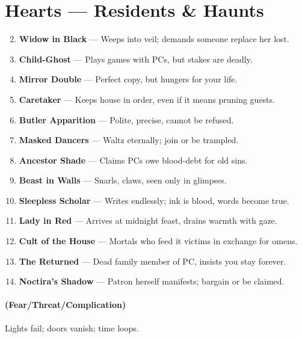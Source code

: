 \documentclass[11pt]{article}
\begin{document}
\section*{Hearts --- Residents \& Haunts}
\label{sec:haunted-house-residents}
\begin{enumerate}
\setcounter{enumi}{1}
\item \textbf{Widow in Black} --- Weeps into veil; demands someone replace her lost.
\item \textbf{Child-Ghost} --- Plays games with PCs, but stakes are deadly.
\item \textbf{Mirror Double} --- Perfect copy, but hungers for your life.
\item \textbf{Caretaker} --- Keeps house in order, even if it means pruning guests.
\item \textbf{Butler Apparition} --- Polite, precise, cannot be refused.
\item \textbf{Masked Dancers} --- Waltz eternally; join or be trampled.
\item \textbf{Ancestor Shade} --- Claims PCs owe blood-debt for old sins.
\item \textbf{Beast in Walls} --- Snarls, claws, seen only in glimpses.
\item \textbf{Sleepless Scholar} --- Writes endlessly; ink is blood, words become true.
\item[J] \textbf{Lady in Red} --- Arrives at midnight feast, drains warmth with gaze.
\item[Q] \textbf{Cult of the House} --- Mortals who feed it victims in exchange for omens.
\item[K] \textbf{The Returned} --- Dead family member of PC, insists you stay forever.
\item[A] \textbf{Noctira's Shadow} --- Patron herself manifests; bargain or be claimed.
\end{enumerate}

\paragraph*{(Fear/Threat/Complication)} Lights fail; doors vanish; time loops.
\end{document}

